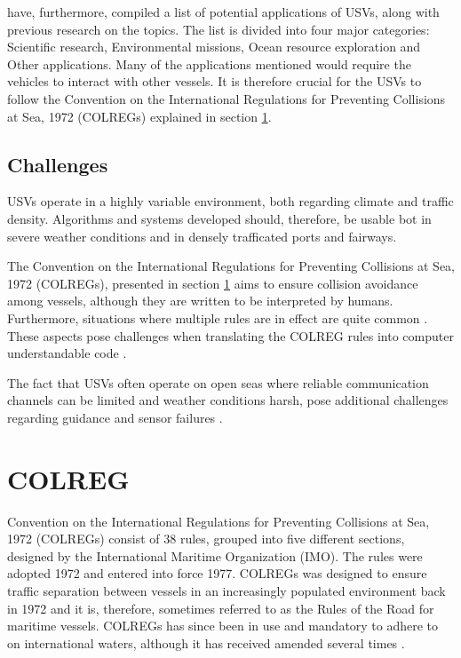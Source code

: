 \textcite{liu2016unmanned} have, furthermore, compiled a list of potential applications of USVs, along with previous research on the topics.
The list is divided into four major categories: Scientific research, Environmental missions, Ocean resource exploration and Other applications.
Many of the applications mentioned would require the vehicles to interact with other vessels.
It is therefore crucial for the USVs to follow the Convention on the International Regulations for Preventing Collisions at Sea, 1972 (COLREGs) explained in section \ref{sec_colreg}.


\subsection{Challenges}
USVs operate in a highly variable environment, both regarding climate and traffic density. Algorithms and systems developed should, therefore, be usable bot in severe weather conditions and in densely trafficated ports and fairways.


The Convention on the International Regulations for Preventing Collisions at Sea, 1972 (COLREGs), presented in section \ref{sec_colreg} aims to ensure collision avoidance among vessels, although they are written to be interpreted by humans. Furthermore, situations where multiple rules are in effect are quite common . These aspects pose challenges when translating the COLREG rules into computer understandable code \cite{benjamin2006method}.

The fact that USVs often operate on open seas where reliable communication channels can be limited and weather conditions harsh, pose additional challenges regarding guidance and sensor failures \cite{liu2016unmanned}.

\section{COLREG}
\label{sec_colreg}
Convention on the International Regulations for Preventing Collisions at Sea, 1972 (COLREGs) consist of 38 rules, grouped into five different sections, designed by the International Maritime Organization (IMO).
The rules were adopted 1972 and entered into force 1977.
COLREGs was designed to ensure traffic separation between vessels in an increasingly populated environment back in 1972 and it is, therefore, sometimes referred to as the Rules of the Road for maritime vessels.
COLREGs has since been in use and mandatory to adhere to on international waters, although it has received amended several times \cite{colreg_about_imo}.

